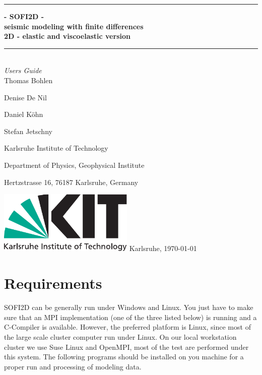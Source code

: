 \documentclass[11pt,onecolumn,oneside]{article}
\begin{document}
\thispagestyle{empty}
\newcommand{\Rule}{\rule{\textwidth}{1mm}}
\newtheorem{theorem}{Hypothese}[section]
\begin{center}
\Rule \vspace{5mm}
\sffamily \bfseries \Huge
- SOFI2D - \\ 
seismic modeling with finite differences \\
2D - elastic and viscoelastic version
\vspace{1mm}\Rule\\
\vspace{1 cm}
\Large\emph{Users Guide}\\
\vspace{2 cm}
\large Thomas Bohlen \par
\large Denise De Nil \par
\large Daniel K\"ohn \par
\large Stefan Jetschny\par
\vspace{2 cm}

\small Karlsruhe Institute of Technology\par
\small Department of Physics, Geophysical Institute \par
\small Hertzstrasse 16, 76187 Karlsruhe, Germany \par

\vfill
\includegraphics[height=30mm]{figures/kit_logo_en_4c_positiv.pdf}
\vfill
\large Karlsruhe, \today
\end{center}
\cleardoublepage
\thispagestyle{empty} 
\cleardoublepage
\thispagestyle{empty}
\ClearShipoutPicture

\tableofcontents
\newpage

\section{Requirements}
\label{requirements}

SOFI2D can be generally run under Windows and Linux. You just have to make sure that an MPI implementation (one of the three listed below) is running and a C-Compiler is available. However, the preferred platform is Linux, since most of the large scale cluster computer run under Linux. On our local workstation cluster we use Suse Linux and OpenMPI, most of the test are performed under this system. The following programs should be installed on you machine for a proper run and processing of modeling data. 
\end{document}
